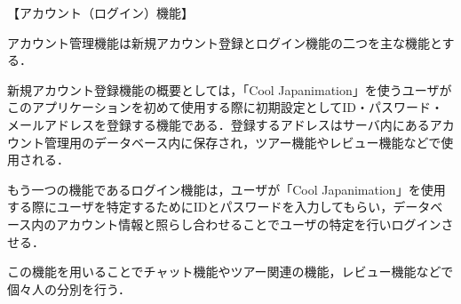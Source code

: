 【アカウント（ログイン）機能】
\par アカウント管理機能は新規アカウント登録とログイン機能の二つを主な機能とする．
\par 新規アカウント登録機能の概要としては，「Cool Japanimation」を使うユーザがこのアプリケーションを初めて使用する際に初期設定としてID・パスワード・メールアドレスを登録する機能である．登録するアドレスはサーバ内にあるアカウント管理用のデータベース内に保存され，ツアー機能やレビュー機能などで使用される．
\par もう一つの機能であるログイン機能は，ユーザが「Cool Japanimation」を使用する際にユーザを特定するためにIDとパスワードを入力してもらい，データベース内のアカウント情報と照らし合わせることでユーザの特定を行いログインさせる．
\par この機能を用いることでチャット機能やツアー関連の機能，レビュー機能などで個々人の分別を行う．
